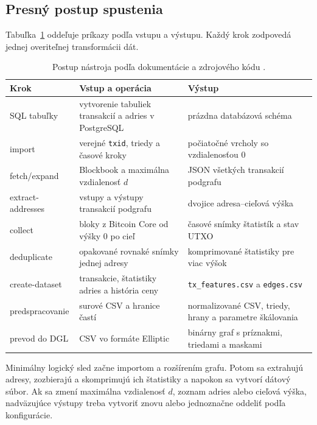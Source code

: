 \subsection{Presný postup spustenia}

Tabuľka~\ref{tab:safar-commands} oddeľuje príkazy podľa vstupu a
výstupu. Každý krok zodpovedá jednej overiteľnej transformácii dát.

\begin{table}[p]
  \centering
  \scriptsize
  \caption{Postup nástroja podľa dokumentácie a zdrojového kódu
  \cite{bitcoinSubgraphBuilder}.}
  \label{tab:safar-commands}
  \begin{tabularx}{\textwidth}{lXX}
    \toprule
    Krok & Vstup a operácia & Výstup \\
    \midrule
    SQL tabuľky & vytvorenie tabuliek transakcií a adries v PostgreSQL
      & prázdna databázová schéma \\
    import & verejné \texttt{txid}, triedy a časové kroky
      & počiatočné vrcholy so vzdialenosťou 0 \\
    fetch/expand & Blockbook a maximálna vzdialenosť $d$
      & JSON všetkých transakcií podgrafu \\
    extract-addresses & vstupy a výstupy transakcií podgrafu
      & dvojice adresa--cieľová výška \\
    collect & bloky z Bitcoin Core od výšky 0 po cieľ
      & časové snímky štatistík a stav UTXO \\
    deduplicate & opakované rovnaké snímky jednej adresy
      & komprimované štatistiky pre viac výšok \\
    create-dataset & transakcie, štatistiky adries a história ceny
      & \texttt{tx\_features.csv} a \texttt{edges.csv} \\
    predspracovanie & surové CSV a hranice častí
      & normalizované CSV, triedy, hrany a parametre škálovania \\
    prevod do DGL & CSV vo formáte Elliptic
      & binárny graf s príznakmi, triedami a maskami \\
    \bottomrule
  \end{tabularx}
\end{table}

Minimálny logický sled začne importom a rozšírením grafu. Potom sa
extrahujú adresy, zozbierajú a skomprimujú ich štatistiky a napokon sa
vytvorí dátový súbor. Ak sa zmení
maximálna vzdialenosť $d$, zoznam adries alebo cieľová výška, nadväzujúce
výstupy treba vytvoriť znovu alebo jednoznačne oddeliť podľa konfigurácie.

